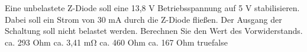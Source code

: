     {Eine unbelastete Z-Diode soll eine 13,8 V Betriebsspannung auf 5 V stabilisieren. Dabei soll ein Strom von 30 mA durch die Z-Diode fließen. Der Ausgang der Schaltung soll nicht belastet werden. Berechnen Sie den Wert des Vorwiderstands.}
    {ca. 293 Ohm}
    {ca. 3,41 \si{\milli\ohm}}
    {ca. 460 Ohm}
    {ca. 167 Ohm}
    {true}{false}